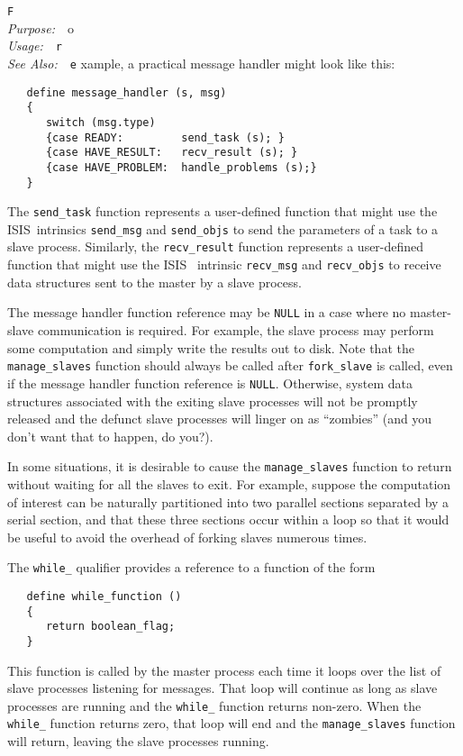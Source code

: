 \documentclass{book}
\makeatletter
\newif\ifpdf
\newcommand{\isisx}{{\sc ISIS~}}
\newenvironment{isisfunction}[4]%
{\index{{#1}@{\tt #1}}%
  \ifpdf
  \else
     \addcontentsline{toc}{subsection}{{#1} -- {#2}}
  \fi
  \vbox{
          \vspace*{\baselineskip}
          {\LARGE\tt #1}\vspace*{\baselineskip}\\
          {{\it Purpose:}~~{#2}}\\
          {{\it Usage:}~~{\tt #3}}\\
          {{\it See Also:}~~{\tt #4}}
       }
}%
{ }
\makeatother
\begin{document}
{\begin{isisfunction}
For example, a practical message handler might look like
this:
\begin{verbatim}
   define message_handler (s, msg)
   {
      switch (msg.type)
      {case READY:         send_task (s); }
      {case HAVE_RESULT:   recv_result (s); }
      {case HAVE_PROBLEM:  handle_problems (s);}
   }
\end{verbatim}
The \verb|send_task| function represents a user-defined
function that might use the \isisx intrinsics \verb|send_msg|
and \verb|send_objs| to send the parameters of a task to a
slave process.  Similarly, the \verb|recv_result| function
represents a user-defined function that might use the \isisx
intrinsic \verb|recv_msg| and \verb|recv_objs| to receive data
structures sent to the master by a slave process.

The message handler function reference may be \verb|NULL| in a
case where no master-slave communication is required.  For
example, the slave process may perform some computation and
simply write the results out to disk.  Note that the
\verb|manage_slaves| function should always be called after
\verb|fork_slave| is called, even if the message handler
function reference is \verb|NULL|. Otherwise, system data
structures associated with the exiting slave processes will not
be promptly released and the defunct slave processes will
linger on as ``zombies'' (and you don't want that to happen, do
you?).

In some situations, it is desirable to cause the
\verb|manage_slaves| function to return without waiting for all
the slaves to exit.  For example, suppose the computation of
interest can be naturally partitioned into two parallel
sections separated by a serial section, and that these three
sections occur within a loop so that it would be useful to
avoid the overhead of forking slaves numerous times.

The \verb|while_| qualifier provides a reference to a function
of the form
\begin{verbatim}
   define while_function ()
   {
      return boolean_flag;
   }
\end{verbatim}
This function is called by the master process each time it
loops over the list of slave processes listening for messages.
That loop will continue as long as slave processes are running
and the \verb|while_| function returns non-zero.  When the
\verb|while_| function returns zero, that loop will end and
the \verb|manage_slaves| function will return, leaving the
slave processes running.


\end{isisfunction}}
\end{document}
